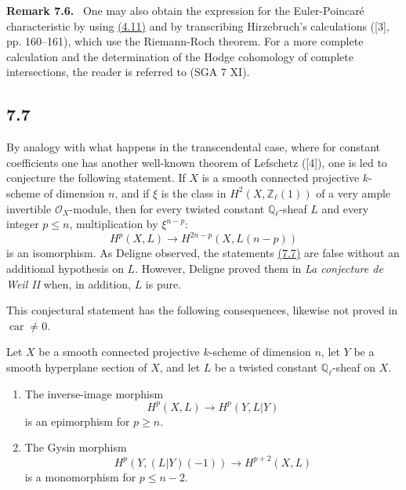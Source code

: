 \documentclass[11pt]{article}
\newenvironment{statement}[1]{\par\medskip\noindent\textbf{#1.}\ }{\par\medskip}
\begin{document}
\label{sga5:VII:remark:7.6}\begin{statement}{Remark 7.6}
One may also obtain the expression for the Euler-Poincaré characteristic by using \hyperref[sga5:VII:proposition:4.11]{(4.11)} and by transcribing Hirzebruch's calculations ([3], pp. 160--161), which use the Riemann-Roch theorem. For a more complete calculation and the determination of the Hodge cohomology of complete intersections, the reader is referred to (SGA 7 XI).
\end{statement}

\subsection*{7.7}\label{sga5:VII:subsection:7.7}

By analogy with what happens in the transcendental case, where for constant coefficients one has another well-known theorem of Lefschetz ([4]), one is led to conjecture the following statement. If $X$ is a smooth connected projective $k$-scheme of dimension $n$, and if $\xi$ is the class in $H^2(X,\mathbb Z_\ell(1))$ of a very ample invertible $\mathcal O_X$-module, then for every twisted constant $\mathbb Q_\ell$-sheaf $L$ and every integer $p\le n$, multiplication by $\xi^{n-p}$:
\[
H^p(X,L)\to H^{2n-p}(X,L(n-p))
\]
is an isomorphism. As Deligne observed, the statements \hyperref[sga5:VII:subsection:7.7]{(7.7)} are false without an additional hypothesis on $L$. However, Deligne proved them in \emph{La conjecture de Weil II} when, in addition, $L$ is pure.

This conjectural statement has the following consequences, likewise not proved in $\operatorname{car}\ne0$.

Let $X$ be a smooth connected projective $k$-scheme of dimension $n$, let $Y$ be a smooth hyperplane section of $X$, and let $L$ be a twisted constant $\mathbb Q_\ell$-sheaf on $X$.
\begin{enumerate}[label=(\roman*)]
\item The inverse-image morphism
\[
H^p(X,L)\to H^p(Y,L|Y)
\]
is an epimorphism for $p\ge n$.
\item The Gysin morphism
\[
H^p(Y,(L|Y)(-1))\to H^{p+2}(X,L)
\]
is a monomorphism for $p\le n-2$.
\end{enumerate}
\end{document}
